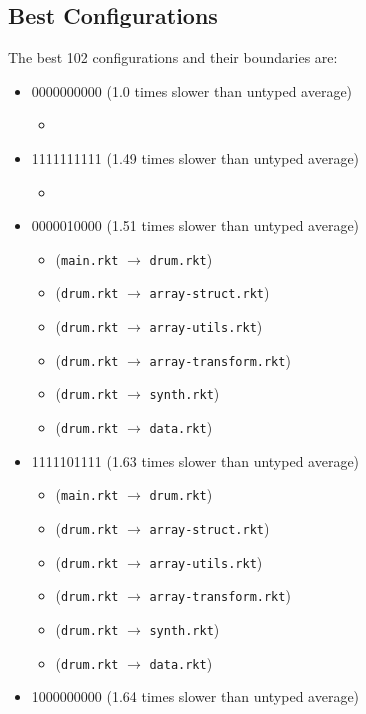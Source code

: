 \documentclass{article}
\newcommand{\mono}[1]{\texttt{#1}}
\begin{document}
\subsection{Best Configurations}
The best 102 configurations and their boundaries are:
\begin{itemize}
\item 0000000000 (1.0 times slower than untyped average)
  \begin{itemize}
  \item 
  \end{itemize}
\item 1111111111 (1.49 times slower than untyped average)
  \begin{itemize}
  \item 
  \end{itemize}
\item 0000010000 (1.51 times slower than untyped average)
  \begin{itemize}
  \item (\mono{main.rkt} $\rightarrow$ \mono{drum.rkt})
  \item (\mono{drum.rkt} $\rightarrow$ \mono{array-struct.rkt})
  \item (\mono{drum.rkt} $\rightarrow$ \mono{array-utils.rkt})
  \item (\mono{drum.rkt} $\rightarrow$ \mono{array-transform.rkt})
  \item (\mono{drum.rkt} $\rightarrow$ \mono{synth.rkt})
  \item (\mono{drum.rkt} $\rightarrow$ \mono{data.rkt})
  \end{itemize}
\item 1111101111 (1.63 times slower than untyped average)
  \begin{itemize}
  \item (\mono{main.rkt} $\rightarrow$ \mono{drum.rkt})
  \item (\mono{drum.rkt} $\rightarrow$ \mono{array-struct.rkt})
  \item (\mono{drum.rkt} $\rightarrow$ \mono{array-utils.rkt})
  \item (\mono{drum.rkt} $\rightarrow$ \mono{array-transform.rkt})
  \item (\mono{drum.rkt} $\rightarrow$ \mono{synth.rkt})
  \item (\mono{drum.rkt} $\rightarrow$ \mono{data.rkt})
  \end{itemize}
\item 1000000000 (1.64 times slower than untyped average)
  \begin{itemize}

\end{itemize}
\end{itemize}
\end{document}
